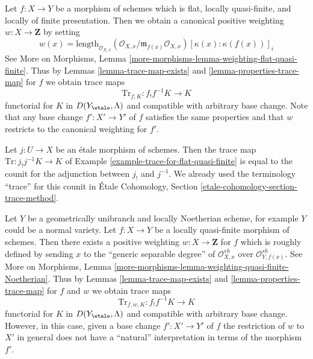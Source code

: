 \begin{example}
\label{example-trace-for-flat-quasi-finite}
Let $f : X \to Y$ be a morphism of schemes which is flat,
locally quasi-finite, and locally of finite presentation.
Then we obtain a canonical positive weighting $w : X \to \mathbf{Z}$
by setting
$$
w(x) = \text{length}_{\mathcal{O}_{X, x}}
(\mathcal{O}_{X, x}/\mathfrak m_{f(x)} \mathcal{O}_{X, x})
[\kappa(x) : \kappa(f(x))]_i
$$
See More on Morphisms, Lemma
\ref{more-morphisms-lemma-weighting-flat-quasi-finite}.
Thus by Lemmas \ref{lemma-trace-map-exists} and
\ref{lemma-properties-trace-map} for $f$ we obtain trace maps
$$
\text{Tr}_{f, K} : f_!f^{-1}K \longrightarrow K
$$
functorial for $K$ in $D(Y_\etale, \Lambda)$ and compatible
with arbitrary base change. Note that any base change
$f' : X' \to Y'$ of $f$ satisfies the same properties and that $w$
restricts to the canonical weighting for $f'$.
\end{example}

\begin{remark}
\label{remark-trace-etale-counit}
Let $j : U \to X$ be an \'etale morphism of schemes. Then the trace
map $\text{Tr} : j_!j^{-1}K \to K$ of
Example \ref{example-trace-for-flat-quasi-finite} is equal to the
counit for the adjunction between $j_!$ and $j^{-1}$.
We already used the terminology ``trace'' for this counit in
\'Etale Cohomology, Section \ref{etale-cohomology-section-trace-method}.
\end{remark}

\begin{example}
\label{example-trace-for-quasi-finite-over-normal}
Let $Y$ be a geometrically unibranch and locally Noetherian scheme,
for example $Y$ could be a normal variety. Let $f : X \to Y$ be a locally
quasi-finite morphism of schemes. Then there exists a
positive weighting $w : X \to \mathbf{Z}$ for $f$
which is roughly defined by sending $x$ to the
``generic separable degree''
of $\mathcal{O}_{X, x}^{sh}$ over $\mathcal{O}_{Y, f(x)}^{sh}$.
See More on Morphisms, Lemma
\ref{more-morphisms-lemma-weighting-quasi-finite-Noetherian}.
Thus by Lemmas \ref{lemma-trace-map-exists} and
\ref{lemma-properties-trace-map} for $f$ and $w$ we obtain trace maps
$$
\text{Tr}_{f, w, K} : f_!f^{-1}K \longrightarrow K
$$
functorial for $K$ in $D(Y_\etale, \Lambda)$ and compatible
with arbitrary base change. However, in this case, given a base change
$f' : X' \to Y'$ of $f$ the restriction of $w$ to $X'$ in general
does not have a ``natural'' interpretation in terms of the
morphism $f'$.
\end{example}
















